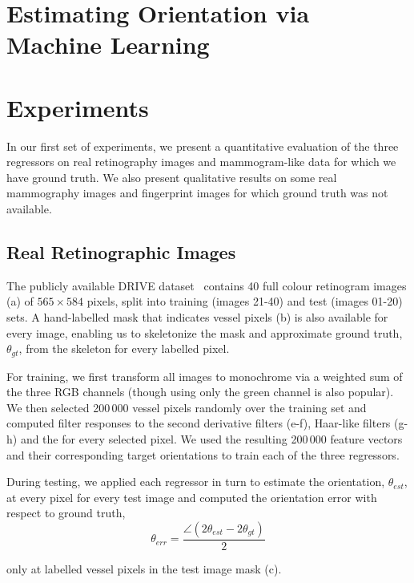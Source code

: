 \section{Estimating Orientation via Machine Learning}
\label{s:learning}


\section{Experiments}
\label{s:expts}
In our first set of experiments, we present a quantitative evaluation of the three regressors on real retinography images and mammogram-like data for which we have ground truth. We also present qualitative results on some real mammography images and fingerprint images for which ground truth was not available.


\subsection{Real Retinographic Images}
\label{s:expts_retinography}
The publicly available DRIVE dataset~\cite{Staal_etal_TMI04} contains 40 full colour retinogram images (a) of $565{\times}584$ pixels, split into training (images 21-40) and test (images 01-20) sets. A hand-labelled mask that indicates vessel pixels (b) is also available for every image, enabling us to skeletonize the mask and approximate ground truth, $\theta_{gt}$, from the skeleton for every labelled pixel.

For training, we first transform all images to monochrome via a weighted sum of the three RGB channels (though using only the green channel is also popular). We then selected 200\,000 vessel pixels randomly over the training set and computed filter responses to the second derivative filters (e-f), Haar-like filters (g-h) and the \dtcwt{} for every selected pixel. We used the resulting 200\,000 feature vectors and their corresponding target orientations to train each of the three regressors.

During testing, we applied each regressor in turn to estimate the orientation, $\theta_{est}$, at every pixel for every test image and computed the orientation error with respect to ground truth,
%
\begin{equation}
	\theta_{err} = \frac{\angle(2\theta_{est}-2\theta_{gt})}{2}
\end{equation}

\noindent only at labelled vessel pixels in the test image mask (c).


